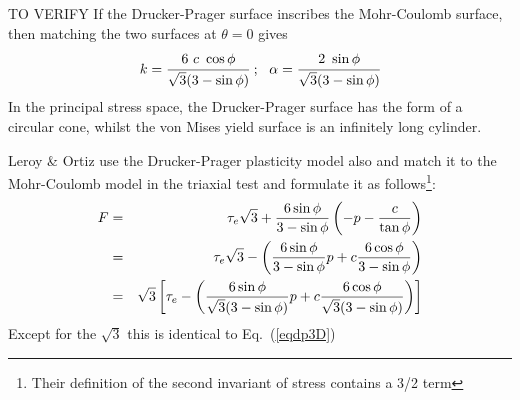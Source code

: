 \vspace{1.3cm}
TO VERIFY
If the Drucker-Prager surface inscribes the Mohr-Coulomb surface, then matching the two surfaces at $\theta=0$  gives
\[
k = \cfrac{6~c~\cos\phi}{\sqrt{3}(3-\sin\phi)} ~;~~ \alpha = \cfrac{2~\sin\phi}{\sqrt{3}(3-\sin\phi)} 
\]
In the principal stress space, the Drucker-Prager surface has the form of a circular cone, whilst the von Mises yield surface is an infinitely long cylinder.



\vspace{1.3cm}
Leroy \& Ortiz \cite{leor89} use the Drucker-Prager plasticity model also and match it to the Mohr-Coulomb model in the 
triaxial test and formulate it as follows\footnote{Their definition of the second invariant of stress contains a 3/2 term}:
\begin{eqnarray}
F 
&=& \tau_e \sqrt{3} + \frac{6 \sin\phi}{3-\sin\phi} \left( -p  - \frac{c}{\tan \phi} \right) \nonumber\\
&=& \tau_e \sqrt{3} - \left( \frac{6 \sin\phi}{3-\sin\phi}  p  + c \frac{6 \cos\phi}{3-\sin\phi} \right) \nonumber\\
&=& \sqrt{3} \left[ \tau_e  - \left( \frac{6 \sin\phi}{\sqrt{3}(3-\sin\phi)}  p  + c \frac{6 \cos\phi}{\sqrt{3}(3-\sin\phi)} \right)  \right]
\end{eqnarray}
Except for the $\sqrt{3}$ this is identical to Eq.~(\ref{eqdp3D})


